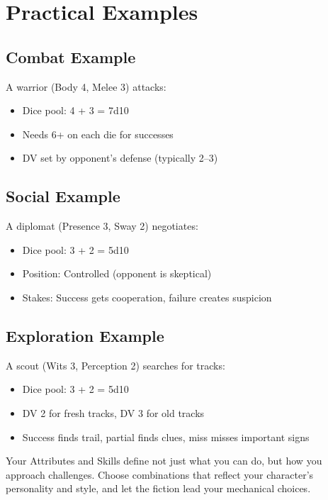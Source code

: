 \documentclass[11pt,twoside,openany]{book}
\begin{document}
\section*{Practical Examples} 

\subsection*{Combat Example}

A warrior (Body 4, Melee 3) attacks:
\begin{itemize}
\item Dice pool: 4 + 3 = 7d10
\item Needs 6+ on each die for successes
\item DV set by opponent's defense (typically 2--3)
\end{itemize}

\subsection*{Social Example}

A diplomat (Presence 3, Sway 2) negotiates:
\begin{itemize}
\item Dice pool: 3 + 2 = 5d10
\item Position: Controlled (opponent is skeptical)
\item Stakes: Success gets cooperation, failure creates suspicion
\end{itemize}

\subsection*{Exploration Example}

A scout (Wits 3, Perception 2) searches for tracks:
\begin{itemize}
\item Dice pool: 3 + 2 = 5d10
\item DV 2 for fresh tracks, DV 3 for old tracks
\item Success finds trail, partial finds clues, miss misses important signs
\end{itemize}

\begin{tcolorbox}[colback=gray!5!white, colframe=gray!75!black, title=Final Note, fonttitle=\bfseries,breakable]
Your Attributes and Skills define not just what you can do, but how you approach challenges. Choose combinations that reflect your character's personality and style, and let the fiction lead your mechanical choices.
\end{tcolorbox}
\end{document}
